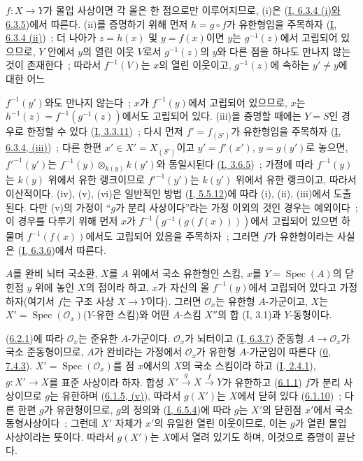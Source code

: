 $f:X\to Y$가 몰입 사상이면 각 올은 한 점으로만 이루어지므로,
(i)은 (\hyperref[I.6.3.4-ko]{I, 6.3.4 (i)와 6.3.5})에서 따른다.
(ii)를 증명하기 위해 먼저 $h=g\circ f$가 유한형임을 주목하자
(\hyperref[I.6.3.4-ko]{I, 6.3.4 (ii)})~; 더 나아가 $z=h(x)$ 및
$y=f(x)$이면 $y$는 $g^{-1}(z)$에서 고립되어 있으므로, $Y$ 안에서
$y$의 열린 이웃 $V$로서 $g^{-1}(z)$의 $y$와 다른 점을 하나도 만나지
않는 것이 존재한다~; 따라서 $f^{-1}(V)$는 $x$의 열린 이웃이고,
$g^{-1}(z)$에 속하는 $y'\neq y$에 대한 어느


$f^{-1}(y')$와도 만나지 않는다~; $x$가 $f^{-1}(y)$에서 고립되어
있으므로, $x$는 $h^{-1}(z)=f^{-1}(g^{-1}(z))$에서도 고립되어 있다.
(iii)을 증명할 때에는 $Y=S$인 경우로 한정할 수 있다
(\hyperref[I.3.3.11-ko]{I, 3.3.11})~; 다시 먼저
$f'=f_{(S')}$가 유한형임을 주목하자
(\hyperref[I.6.3.4-ko]{I, 6.3.4, (iii)})~; 다른 한편
$x'\in X'=X_{(S')}$이고 $y'=f'(x')$, $y=g(y')$로 놓으면,
$f'^{-1}(y')$는 $f^{-1}(y)\otimes_{k(y)}k(y')$와 동일시된다
(\hyperref[I.3.6.5-ko]{I, 3.6.5})~; 가정에 따라 $f^{-1}(y)$는
$k(y)$ 위에서 유한 랭크이므로 $f'^{-1}(y')$는 $k(y')$ 위에서
유한 랭크이고, 따라서 이산적이다. (iv), (v), (vi)은 일반적인 방법
(\hyperref[I.5.5.12-ko]{I, 5.5.12})에 따라 (i), (ii), (iii)에서
도출된다. 다만 (v)의 가정이 ``$g$가 분리 사상이다''라는 가정 이외의
것인 경우는 예외이다~; 이 경우를 다루기 위해 먼저 $x$가
$f^{-1}(g^{-1}(g(f(x))))$에서 고립되어 있으면 하물며
$f^{-1}(f(x))$에서도 고립되어 있음을 주목하자~; 그러면 $f$가
유한형이라는 사실은 (\hyperref[I.6.3.6-ko]{I, 6.3.6})에서 따른다.

\begin{proposition}[6.2.5]
\label{II.6.2.5-ko}
$A$를 완비 뇌터 국소환, $X$를 $A$ 위에서 국소 유한형인 스킴,
$x$를 $Y=\operatorname{Spec}(A)$의 닫힌점 $y$ 위에 놓인 $X$의
점이라 하고, $x$가 자신의 올 $f^{-1}(y)$에서 고립되어 있다고
가정하자(여기서 $f$는 구조 사상 $X\to Y$이다). 그러면
$\mathcal{O}_x$는 유한형 $A$-가군이고, $X$는
$X'=\operatorname{Spec}(\mathcal{O}_x)$($Y$-유한 스킴)와 어떤
$A$-스킴 $X''$의 합 (I, 3.1)과 $Y$-동형이다.
\end{proposition}

(\hyperref[II.6.2.1-ko]{6.2.1})에 따라 $\mathcal{O}_x$는 준유한
$A$-가군이다. $\mathcal{O}_x$가 뇌터이고
(\hyperref[I.6.3.7-ko]{I, 6.3.7}) 준동형
$A\to\mathcal{O}_x$가 국소 준동형이므로, $A$가 완비라는 가정에서
$\mathcal{O}_x$가 유한형 $A$-가군임이 따른다
(\hyperref[0.7.4.3-ko]{0, 7.4.3}).
$X'=\operatorname{Spec}(\mathcal{O}_x)$를 점 $x$에서의 $X$의
국소 스킴이라 하고 (\hyperref[I.2.4.1-ko]{I, 2.4.1}),
$g:X'\to X$를 표준 사상이라 하자. 합성
$X'\xrightarrow{g}X\xrightarrow{f}Y$가 유한하고
(\hyperref[II.6.1.1-ko]{6.1.1}) $f$가 분리 사상이므로 $g$는
유한하며 (\hyperref[II.6.1.5-ko]{6.1.5, (v)}), 따라서 $g(X')$는
$X$에서 닫혀 있다 (\hyperref[II.6.1.10-ko]{6.1.10})~; 다른 한편
$g$가 유한형이므로, $g$의 정의와
(\hyperref[I.6.5.4-ko]{I, 6.5.4})에 따라 $g$는 $X'$의 닫힌점
$x'$에서 국소 동형사상이다~; 그런데 $X'$ 자체가 $x'$의 유일한
열린 이웃이므로, 이는 $g$가 열린 몰입 사상이라는 뜻이다. 따라서
$g(X')$는 $X$에서 열려 있기도 하며, 이것으로 증명이 끝난다.

